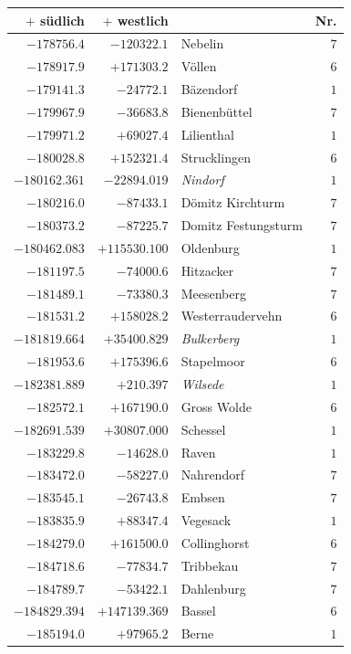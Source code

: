 \clearpage{}%
\begin{center}\begingroup\fontsize{8}{9}\selectfont
\setlength{\tabcolsep}{4pt}
\begin{tabular}{r|r|p{170pt}|r}\hline
\(+\) südlich&\(+\) westlich&&Nr.\\\hline
\(-178756.4\)&\(-120322.1\)&Nebelin&\(7\)\\
\(-178917.9\)&\(+171303.2\)&Völlen&\(6\)\\
\(-179141.3\)&\(-24772.1\)&Bäzendorf&\(1\)\\
\(-179967.9\)&\(-36683.8\)&Bienenbüttel&\(7\)\\
\(-179971.2\)&\(+69027.4\)&Lilienthal&\(1\)\\
\(-180028.8\)&\(+152321.4\)&Strucklingen&\(6\)\\
\(-180162.361\)&\(-22894.019\)&\textit{Nindorf}&\(1\)\\
\(-180216.0\)&\(-87433.1\)&Dömitz Kirchturm&\(7\)\\
\(-180373.2\)&\(-87225.7\)&Domitz Festungsturm&\(7\)\\
\(-180462.083\)&\(+115530.100\)&Oldenburg&\(1\)\\
\(-181197.5\)&\(-74000.6\)&Hitzacker&\(7\)\\
\(-181489.1\)&\(-73380.3\)&Meesenberg&\(7\)\\
\(-181531.2\)&\(+158028.2\)&Westerraudervehn&\(6\)\\
\(-181819.664\)&\(+35400.829\)&\textit{Bulkerberg}&\(1\)\\
\(-181953.6\)&\(+175396.6\)&Stapelmoor&\(6\)\\
\(-182381.889\)&\(+210.397\)&\textit{Wilsede}&\(1\)\\
\(-182572.1\)&\(+167190.0\)&Gross Wolde&\(6\)\\
\(-182691.539\)&\(+30807.000\)&Schessel&\(1\)\\
\(-183229.8\)&\(-14628.0\)&Raven&\(1\)\\
\(-183472.0\)&\(-58227.0\)&Nahrendorf&\(7\)\\
\(-183545.1\)&\(-26743.8\)&Embsen&\(7\)\\
\(-183835.9\)&\(+88347.4\)&Vegesack&\(1\)\\
\(-184279.0\)&\(+161500.0\)&Collinghorst&\(6\)\\
\(-184718.6\)&\(-77834.7\)&Tribbekau&\(7\)\\
\(-184789.7\)&\(-53422.1\)&Dahlenburg&\(7\)\\
\(-184829.394\)&\(+147139.369\)&Bassel&\(6\)\\
\(-185194.0\)&\(+97965.2\)&Berne&\(1\)\\

\end{tabular}
\end{center}
